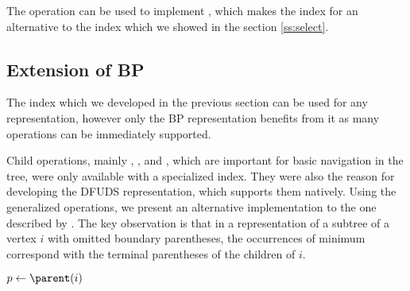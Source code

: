 The operation \fwdSearch{} can be used to implement \select{}, which makes the index for \fwdSearch{} an alternative to the index which we showed in the section \ref{ss:select}.

\begin{algorithm}
\begin{algorithmic}
	 
		\State {} 
		\State {}
	\Else
		\State {}
	\EndIf
\EndFunction
\end{algorithmic}
\end{algorithm}

\subsection{Extension of BP}

The index which we developed in the previous section can be used for any representation, however only the BP representation benefits from it as many operations can be immediately supported.

Child operations, mainly \degree{}, \childRank{}, and \childSelect{}, which are important for basic navigation in the tree, were only available with a specialized index.
They were also the reason for developing the DFUDS representation, which supports them natively.
Using the generalized \rmq{} operations, we present an alternative implementation to the one described by \cite{sadakane2010fully}.
The key observation is that in a representation of a subtree of a vertex $i$ with omitted boundary parentheses, the occurrences of minimum correspond with the terminal parentheses of the children of $i$.

\begin{algorithm}
\begin{algorithmic}
	\State {}
\EndFunction
\end{algorithmic}
\end{algorithm}

\begin{algorithm}
\begin{algorithmic}
	\State $p \gets \parent(i)$
	\State {}
\EndFunction
\end{algorithmic}
\end{algorithm}


